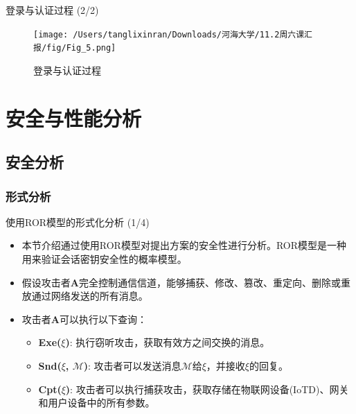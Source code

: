 \documentclass{beamer}
\begin{document}
\begin{frame}{登录与认证过程 (2/2)}
    \begin{figure}
        \centering
        \texttt{[image: /Users/tanglixinran/Downloads/河海大学/11.2周六课汇报/fig/Fig\_5.png]} %
        \vspace{-0.4cm}  %
        \caption{登录与认证过程}
        \label{Fig_5}
    \end{figure}
\end{frame}

\section{安全与性能分析}
\subsection{安全分析}
\subsubsection{形式分析}
\begin{frame}{使用ROR模型的形式化分析 (1/4)}
    \begin{itemize}
        \item 本节介绍通过使用ROR模型对提出方案的安全性进行分析。ROR模型是一种用来验证会话密钥安全性的概率模型。
        \item 假设攻击者\textbf{A}完全控制通信信道，能够捕获、修改、篡改、重定向、删除或重放通过网络发送的所有消息。
        \item 攻击者\textbf{A}可以执行以下查询：
        \begin{itemize}
            \item \textbf{Exe($\xi$)}: 执行窃听攻击，获取有效方之间交换的消息。
            \item \textbf{Snd($\xi$, $\mathcal{M}$)}: 攻击者可以发送消息$\mathcal{M}$给$\xi$，并接收$\xi$的回复。
            \item \textbf{Cpt($\xi$)}: 攻击者可以执行捕获攻击，获取存储在物联网设备(IoTD)、网关和用户设备中的所有参数。
        \end{itemize}
    \end{itemize}
\end{frame}
\end{document}
